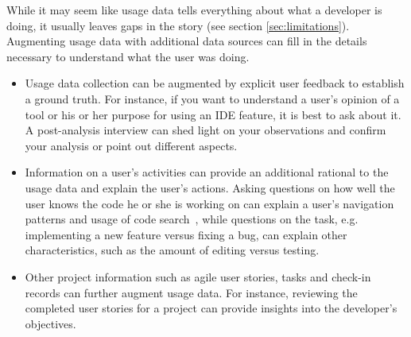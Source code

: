 While it may seem like usage data tells everything about what a developer is doing, it usually leaves gaps in the story (see section \ref{sec:limitations}).  Augmenting usage data with additional data sources can fill in the details necessary to understand what the user was doing.

\begin{itemize}
    \item Usage data collection can be augmented by explicit user feedback to establish a ground truth. For instance, if you want to understand a user's opinion of a tool or his or her purpose for using an IDE feature, it is best to ask about it. A post-analysis interview can shed light on your observations and confirm your analysis or point out different aspects.
    \item Information on a user's activities can provide an additional rational to the usage data and explain the user's actions. Asking questions on how well the user knows the code he or she is working on can explain a user's navigation patterns and usage of code search~\cite{wbsnipesthesis}, while questions on the task, e.g. implementing a new feature versus fixing a bug, can explain other characteristics, such as the amount of editing versus testing.
    \item Other project information such as agile user stories, tasks and check-in records can further augment usage data. For instance, reviewing the completed user stories for a project can provide insights into the developer's objectives.

\end{itemize}
